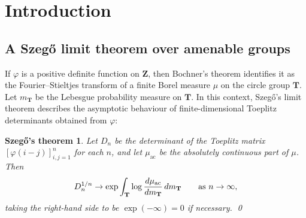 \documentclass[12pt,a4paper]{article}
\numberwithin{equation}{section}
\newtheorem*{Szeg}{Szeg\H{o}'s theorem}
\theoremstyle{remark}
\renewcommand{\rm}[1]{\mathrm{#1}}
\renewcommand{\cal}[1]{\mathcal{#1}}
\newcommand{\bbT}{\mathbf{T}}
\newcommand{\bbZ}{\mathbf{Z}}
\newcommand{\A}{\mathfrak{A}}
\newcommand{\B}{\mathfrak{B}}
\newcommand{\frL}{\mathfrak{L}}
\renewcommand{\phi}{\varphi}
\begin{document}
%
%
%
%
%

\section{Introduction}

\subsection{A Szeg\H{o} limit theorem over amenable groups}

If $\phi$ is a positive definite function on $\bbZ$, then Bochner's theorem identifies it as the Fourier--Stieltjes transform of a finite Borel measure $\mu$ on the circle group $\bbT$.  Let $m_\bbT$ be the Lebesgue probability measure on $\bbT$. In this context, Szeg\H{o}'s limit theorem describes the asymptotic behaviour of finite-dimensional Toeplitz determinants obtained from $\phi$:

\begin{Szeg}
Let $D_n$ be the determinant of the Toeplitz matrix $[\phi(i-j)]_{i,j=1}^n$ for each $n$, and let $\mu_{\rm{ac}}$ be the absolutely continuous part of $\mu$.  Then
\begin{equation}\label{eq:Szeg}
D_n^{1/n} \to \exp\int_\bbT \log \frac{d\mu_{\rm{ac}}}{dm_\bbT}\,dm_\bbT \qquad \hbox{as}\ n\to\infty,
\end{equation}
taking the right-hand side to be $\exp(-\infty) = 0$ if necessary. \qed
\end{Szeg}
\end{document}
